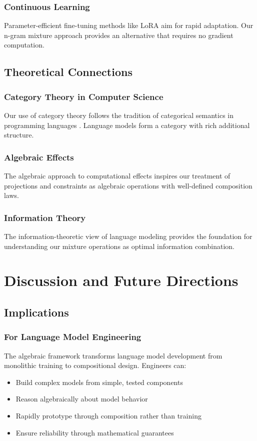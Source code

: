\documentclass{article}
\theoremstyle{definition}
\begin{document}
\subsubsection{Continuous Learning}
Parameter-efficient fine-tuning methods like LoRA \cite{placeholder} aim for rapid adaptation. Our n-gram mixture approach provides an alternative that requires no gradient computation.

\subsection{Theoretical Connections}

\subsubsection{Category Theory in Computer Science}
Our use of category theory follows the tradition of categorical semantics in programming languages \cite{placeholder}. Language models form a category with rich additional structure.

\subsubsection{Algebraic Effects}
The algebraic approach to computational effects \cite{placeholder} inspires our treatment of projections and constraints as algebraic operations with well-defined composition laws.

\subsubsection{Information Theory}
The information-theoretic view of language modeling \cite{placeholder} provides the foundation for understanding our mixture operations as optimal information combination.

\section{Discussion and Future Directions}

\subsection{Implications}

\subsubsection{For Language Model Engineering}
The algebraic framework transforms language model development from monolithic training to compositional design. Engineers can:
\begin{itemize}
    \item Build complex models from simple, tested components
    \item Reason algebraically about model behavior
    \item Rapidly prototype through composition rather than training
    \item Ensure reliability through mathematical guarantees
\end{itemize}
\end{document}
